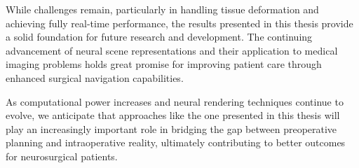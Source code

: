 While challenges remain, particularly in handling tissue deformation and achieving fully real-time performance, the results presented in this thesis provide a solid foundation for future research and development. The continuing advancement of neural scene representations and their application to medical imaging problems holds great promise for improving patient care through enhanced surgical navigation capabilities.

As computational power increases and neural rendering techniques continue to evolve, we anticipate that approaches like the one presented in this thesis will play an increasingly important role in bridging the gap between preoperative planning and intraoperative reality, ultimately contributing to better outcomes for neurosurgical patients. 